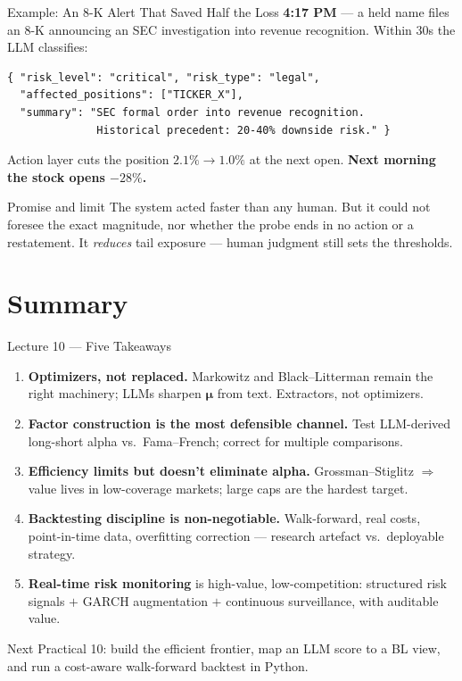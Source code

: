\documentclass[9pt,t]{beamer}
\begin{document}
\begin{frame}[fragile]{Example: An 8-K Alert That Saved Half the Loss}
\textbf{4:17 PM} --- a held name files an 8-K announcing an SEC investigation into
revenue recognition. Within 30s the LLM classifies:
\begin{verbatim}
{ "risk_level": "critical", "risk_type": "legal",
  "affected_positions": ["TICKER_X"],
  "summary": "SEC formal order into revenue recognition.
              Historical precedent: 20-40% downside risk." }
\end{verbatim}
Action layer cuts the position $2.1\%\to1.0\%$ at the next open.
\textbf{Next morning the stock opens $-28\%$.}

\medskip
\begin{alertblock}{Promise and limit}
The system acted faster than any human. But it could not foresee the exact
magnitude, nor whether the probe ends in no action or a restatement.
It \emph{reduces} tail exposure --- human judgment still sets the thresholds.
\end{alertblock}
\end{frame}

\section{Summary}

\begin{frame}{Lecture 10 --- Five Takeaways}
\small
\begin{enumerate}
  \item \textbf{Optimizers, not replaced.} Markowitz and Black--Litterman remain the
        right machinery; LLMs sharpen $\boldsymbol{\mu}$ from text. Extractors, not optimizers.
  \item \textbf{Factor construction is the most defensible channel.} Test LLM-derived
        long-short alpha vs.\ Fama--French; correct for multiple comparisons.
  \item \textbf{Efficiency limits but doesn't eliminate alpha.} Grossman--Stiglitz $\Rightarrow$
        value lives in low-coverage markets; large caps are the hardest target.
  \item \textbf{Backtesting discipline is non-negotiable.} Walk-forward, real costs,
        point-in-time data, overfitting correction --- research artefact vs.\ deployable strategy.
  \item \textbf{Real-time risk monitoring} is high-value, low-competition: structured risk
        signals $+$ GARCH augmentation $+$ continuous surveillance, with auditable value.
\end{enumerate}

\medskip
\begin{block}{Next}
Practical 10: build the efficient frontier, map an LLM score to a BL view, and run a
cost-aware walk-forward backtest in Python.
\end{block}
\end{frame}
\end{document}
